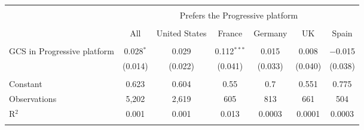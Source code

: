 
\begin{tabular}{@{\extracolsep{5pt}}lcccccc} 
\\[-1.8ex]\hline 
\hline \\[-1.8ex] 
 & \multicolumn{6}{c}{Prefers the Progressive platform} \\ 
\cline{2-7} 
\\[-1.8ex] & All & United States & France & Germany & UK & Spain \\ 
\hline \\[-1.8ex] 
 GCS in Progressive platform & 0.028$^{*}$ & 0.029 & 0.112$^{***}$ & 0.015 & 0.008 & $-$0.015 \\ 
  & (0.014) & (0.022) & (0.041) & (0.033) & (0.040) & (0.038) \\ 
 \hline \\[-1.8ex] 
Constant & 0.623 & 0.604 & 0.55 & 0.7 & 0.551 & 0.775 \\ 
Observations & 5,202 & 2,619 & 605 & 813 & 661 & 504 \\ 
R$^{2}$ & 0.001 & 0.001 & 0.013 & 0.0003 & 0.0001 & 0.0003 \\ 
\hline 
\hline \\[-1.8ex] 
\end{tabular} 